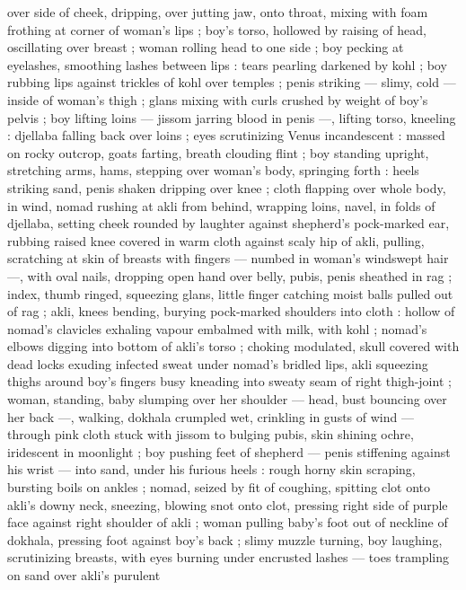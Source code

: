 over side of cheek, dripping, over jutting jaw, onto throat, mixing with
foam frothing at corner of woman's lips ; boy's torso, hollowed by
raising of head, oscillating over breast ; woman rolling head to one
side ; boy pecking at eyelashes, smoothing lashes between lips :
tears pearling darkened by kohl ; boy rubbing lips against trickles of
kohl over temples ; penis striking --- slimy, cold --- inside of
woman's thigh ; glans mixing with curls crushed by weight of boy’s
pelvis ; boy lifting loins --- jissom jarring blood in penis ---, lifting
torso, kneeling : djellaba falling back over loins ; eyes scrutinizing
Venus incandescent : massed on rocky outcrop, goats farting, breath
clouding flint ; boy standing upright, stretching arms, hams, stepping
over woman's body, springing forth : heels striking sand, penis
shaken dripping over knee ; cloth flapping over whole body, in wind,
nomad rushing at akli from behind, wrapping loins, navel, in folds of
djellaba, setting cheek rounded by laughter against shepherd's
pock-marked ear, rubbing raised knee covered in warm cloth against
scaly hip of akli, pulling, scratching at skin of breasts with fingers ---
numbed in woman's windswept hair ---, with oval nails, dropping
open hand over belly, pubis, penis sheathed in rag ; index, thumb
ringed, squeezing glans, little finger catching moist balls pulled out
of rag ; akli, knees bending, burying pock-marked shoulders into
cloth : hollow of nomad’s clavicles exhaling vapour embalmed with
milk, with kohl ; nomad’s elbows digging into bottom of akli’s torso
; choking modulated, skull covered with dead locks exuding infected
sweat under nomad's bridled lips, akli squeezing thighs around boy's
fingers busy kneading into sweaty seam of right thigh-joint ; woman,
standing, baby slumping over her shoulder --- head, bust bouncing
over her back ---, walking, dokhala crumpled wet, crinkling in gusts
of wind --- through pink cloth stuck with jissom to bulging pubis, skin
shining ochre, iridescent in moonlight ; boy pushing feet of shepherd
--- penis stiffening against his wrist --- into sand, under his furious
heels : rough horny skin scraping, bursting boils on ankles ; nomad,
seized by fit of coughing, spitting clot onto akli’s downy neck,
sneezing, blowing snot onto clot, pressing right side of purple face
against right shoulder of akli ; woman pulling baby's foot out of
neckline of dokhala, pressing foot against boy's back ; slimy muzzle
turning, boy laughing, scrutinizing breasts, with eyes burning under
encrusted lashes --- toes trampling on sand over akli’s purulent
